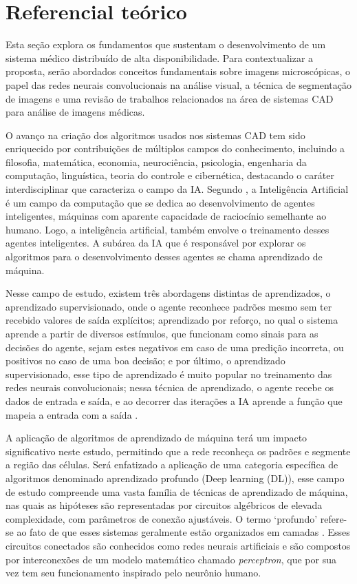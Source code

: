 \section{Referencial teórico}

Esta seção explora os fundamentos que sustentam o desenvolvimento de um sistema médico distribuído de alta disponibilidade.
Para contextualizar a proposta, serão abordados conceitos fundamentais sobre imagens microscópicas, o papel das redes neurais convolucionais na análise visual, a técnica de segmentação de imagens e uma revisão de trabalhos relacionados na área de sistemas CAD para análise de imagens médicas.

O avanço na criação dos algoritmos usados nos sistemas CAD tem sido enriquecido por contribuições de múltiplos campos do conhecimento, incluindo a filosofia, matemática, economia, neurociência, psicologia, engenharia da computação, linguística, teoria do controle e cibernética, destacando o caráter interdisciplinar que caracteriza o campo da IA. Segundo \cite{10.5555/1671238}, a Inteligência Artificial  é um campo da computação que se dedica ao desenvolvimento de agentes inteligentes, máquinas com aparente capacidade de raciocínio semelhante ao humano. Logo, a inteligência artificial, também envolve o treinamento desses agentes inteligentes. A subárea da IA que é responsável por explorar os algoritmos para o desenvolvimento desses agentes se chama aprendizado de máquina. 

Nesse campo de estudo, existem três abordagens distintas de aprendizados, o aprendizado supervisionado, onde o agente reconhece padrões mesmo sem ter recebido valores de saída explícitos; aprendizado por reforço, no qual o sistema aprende a partir de diversos estímulos, que funcionam como sinais para as decisões do agente, sejam estes negativos em caso de uma predição incorreta, ou positivos no caso de uma boa decisão; e por último, o aprendizado supervisionado, esse tipo de aprendizado é muito popular no treinamento das redes neurais convolucionais; nessa técnica de aprendizado, o agente recebe os dados de entrada e saída, e ao decorrer das iterações a IA aprende a função que mapeia a entrada com a saída \cite{haykin2009neural}.

A aplicação de algoritmos de aprendizado de máquina terá um impacto significativo neste estudo, permitindo que a rede reconheça os padrões e segmente a região das células. Será enfatizado a aplicação de uma categoria específica de algoritmos denominado aprendizado profundo (Deep learning (DL)), esse campo de estudo compreende uma vasta família de técnicas de aprendizado de máquina, nas quais as hipóteses são representadas por circuitos algébricos de elevada complexidade, com parâmetros de conexão ajustáveis. O termo ‘profundo’ refere-se ao fato de que esses sistemas geralmente estão organizados em camadas \cite{10.5555/1671238}. Esses circuitos conectados são conhecidos como redes neurais artificiais e são compostos por interconexões de um modelo matemático chamado \textit{perceptron}, que por sua vez tem seu funcionamento inspirado pelo neurônio humano.

